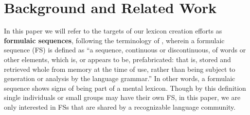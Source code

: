 \documentclass[11pt,letterpaper]{article}
\newcommand{\termdef}[1]{\textbf{#1}\xspace}
\begin{document}
\section{Background and Related Work}

In this paper we will refer to the targets of our lexicon creation efforts as \termdef{formulaic sequences}, following the terminology of , wherein a formulaic sequence (FS) is defined as ``a sequence, continuous or discontinuous, of words or other elements, which is, or appears to be, prefabricated: that is, stored and retrieved whole from memory at the time of use, rather than being subject to generation or analysis by the language grammar.'' In other words, a formulaic sequence shows signs of being part of a mental lexicon. Though by this definition single individuals or small groups may have their own FS, in this paper, we are only interested in FSs that are shared by a recognizable language community. 
\end{document}
